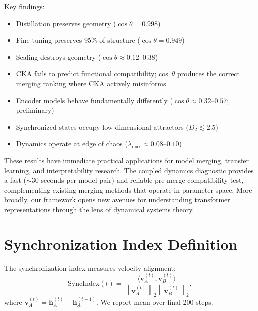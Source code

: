 \documentclass[10pt]{article} %
\theoremstyle{plain}
\theoremstyle{definition}
\theoremstyle{remark}
\newcommand{\norm}[1]{\left\lVert#1\right\rVert}
\newcommand{\inner}[2]{\langle #1, #2 \rangle}
\newcommand{\vect}[1]{\bm{#1}}
\begin{document}
Key findings:
\begin{itemize}
    \item Distillation preserves geometry ($\cos \theta = 0.998$)
    \item Fine-tuning preserves 95\% of structure ($\cos \theta = 0.949$)
    \item Scaling destroys geometry ($\cos \theta \approx 0.12$--$0.38$)
    \item CKA fails to predict functional compatibility; cos~$\theta$ produces the correct merging ranking where CKA actively misinforms
    \item Encoder models behave fundamentally differently ($\cos \theta \approx 0.32$--$0.57$; preliminary)
    \item Synchronized states occupy low-dimensional attractors ($D_2 \lesssim 2.5$)
    \item Dynamics operate at edge of chaos ($\lambda_{\max} \approx 0.08$--$0.10$)
\end{itemize}

These results have immediate practical applications for model merging, transfer learning, and interpretability research. The coupled dynamics diagnostic provides a fast ($\sim$30 seconds per model pair) and reliable pre-merge compatibility test, complementing existing merging methods that operate in parameter space. More broadly, our framework opens new avenues for understanding transformer representations through the lens of dynamical systems theory.




\appendix

\section{Synchronization Index Definition}

The synchronization index measures velocity alignment:
\begin{equation}
    \text{SyncIndex}(t) = \frac{\inner{\vect{v}_A^{(t)}}{\vect{v}_B^{(t)}}}{\norm{\vect{v}_A^{(t)}}_2 \norm{\vect{v}_B^{(t)}}_2},
\end{equation}
where $\vect{v}_A^{(t)} = \vect{h}_A^{(t)} - \vect{h}_A^{(t-1)}$. We report mean over final 200 steps.
\end{document}
